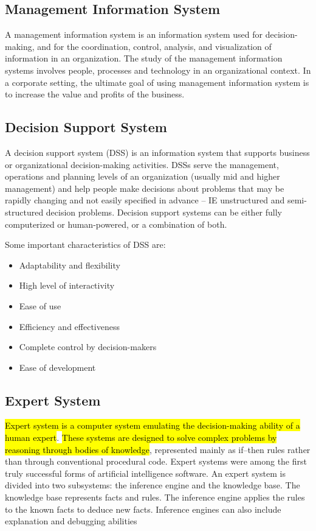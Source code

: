 \documentclass[12pt, a4paper]{article}
\begin{document}
\subsection{Management Information System}%
A management information system is an information system used for
decision-making, and for the coordination, control, analysis, and
visualization of information in an organization. The study of the management
information systems involves people, processes and technology in an
organizational context. In a corporate setting, the ultimate goal of using
management information system is to increase the value and profits of the
business.%

\subsection{Decision Support System}%
A decision support system (DSS) is an information system that supports
business or organizational decision-making activities. DSSs serve the 
management, operations and planning levels of an organization (usually
mid and higher management) and help people make decisions about
problems that may be rapidly changing and not easily specified in
advance -- IE unstructured and semi-structured decision problems.
Decision support systems can be either fully computerized or
human-powered, or a combination of both.

Some important characteristics of DSS are:
\begin{itemize}
  \item Adaptability and flexibility
  \item High level of interactivity
  \item Ease of use
  \item Efficiency and effectiveness
  \item Complete control by decision-makers
  \item Ease of development
\end{itemize}%

\subsection{Expert System}%
\hl{Expert system is a computer system emulating the decision-making ability
of a human expert}. \hl{These systems are designed to solve complex problems
by reasoning through bodies of knowledge}, represented mainly as if–then rules
rather than through conventional procedural code. Expert systems were among
the first truly successful forms of artificial intelligence software. An
expert system is divided into two subsystems: the inference engine and the
knowledge base. The knowledge base represents facts and rules. The inference
engine applies the rules to the known facts to deduce new facts. Inference
engines can also include explanation and debugging abilities%
\end{document}
